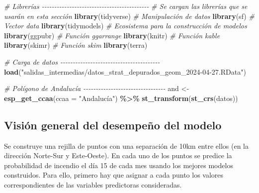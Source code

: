 \documentclass[12pt,a4paper,]{book}
\newenvironment{Shaded}{\begin{snugshade}}{\end{snugshade}}
\newcommand{\AttributeTok}[1]{\textcolor[rgb]{0.13,0.29,0.53}{#1}}
\newcommand{\CommentTok}[1]{\textcolor[rgb]{0.56,0.35,0.01}{\textit{#1}}}
\newcommand{\FunctionTok}[1]{\textcolor[rgb]{0.13,0.29,0.53}{\textbf{#1}}}
\newcommand{\NormalTok}[1]{#1}
\newcommand{\OtherTok}[1]{\textcolor[rgb]{0.56,0.35,0.01}{#1}}
\newcommand{\SpecialCharTok}[1]{\textcolor[rgb]{0.81,0.36,0.00}{\textbf{#1}}}
\newcommand{\StringTok}[1]{\textcolor[rgb]{0.31,0.60,0.02}{#1}}
\numberwithin{dummy}{section}
\theoremstyle{ocrenumbox}
\theoremstyle{blacknumex}
\theoremstyle{blacknumbox}
\theoremstyle{ocrenum}
\theoremstyle{ocrenum}
\begin{document}
\begin{Shaded}
\begin{Highlighting}[]
\CommentTok{\# Librerías {-}{-}{-}{-}{-}{-}{-}{-}{-}{-}{-}{-}{-}{-}{-}{-}{-}{-}{-}{-}{-}{-}{-}{-}{-}{-}{-}{-}{-}{-}{-}{-}{-}{-}{-}{-}{-}{-}{-}{-}{-}{-}{-}}
\CommentTok{\# Se cargan las librerías que se usarán en esta sección}
\FunctionTok{library}\NormalTok{(tidyverse) }\CommentTok{\# Manipulación de datos }
\FunctionTok{library}\NormalTok{(sf) }\CommentTok{\# Vector data}
\FunctionTok{library}\NormalTok{(tidymodels) }\CommentTok{\# Ecosistema para la construcción de modelos}
\FunctionTok{library}\NormalTok{(ggpubr) }\CommentTok{\# Función ggarrange}
\FunctionTok{library}\NormalTok{(knitr) }\CommentTok{\# Función kable}
\FunctionTok{library}\NormalTok{(skimr) }\CommentTok{\# Función skim}
\FunctionTok{library}\NormalTok{(terra)}

\CommentTok{\# Carga de datos {-}{-}{-}{-}{-}{-}{-}{-}{-}{-}{-}{-}{-}{-}{-}{-}{-}{-}{-}{-}{-}{-}{-}{-}{-}{-}{-}{-}{-}{-}{-}{-}{-}{-}{-}{-}{-}{-}{-}{-}}
\FunctionTok{load}\NormalTok{(}\StringTok{"salidas\_intermedias/datos\_strat\_depurados\_geom\_2024{-}04{-}27.RData"}\NormalTok{) }

\CommentTok{\# Polígono de Andalucía {-}{-}{-}{-}{-}{-}{-}{-}{-}{-}{-}{-}{-}{-}{-}{-}{-}{-}{-}{-}{-}{-}{-}{-}{-}{-}{-}{-}{-}{-}{-}{-}{-}}
\NormalTok{and }\OtherTok{\textless{}{-}} \FunctionTok{esp\_get\_ccaa}\NormalTok{(}\AttributeTok{ccaa =} \StringTok{"Andalucía"}\NormalTok{) }\SpecialCharTok{\%\textgreater{}\%} 
  \FunctionTok{st\_transform}\NormalTok{(}\FunctionTok{st\_crs}\NormalTok{(datos))}
\end{Highlighting}
\end{Shaded}

\hypertarget{visiuxf3n-general-del-desempeuxf1o-del-modelo}{%
\subsection{Visión general del desempeño del
modelo}\label{visiuxf3n-general-del-desempeuxf1o-del-modelo}}

Se construye una rejilla de puntos con una separación de 10km entre
ellos (en la dirección Norte-Sur y Este-Oeste). En cada uno de los
puntos se predice la probabilidad de incendio el día 15 de cada mes
usando los mejores modelos construidos. Para ello, primero hay que
asignar a cada punto los valores correspondientes de las variables
predictoras consideradas.
\end{document}
